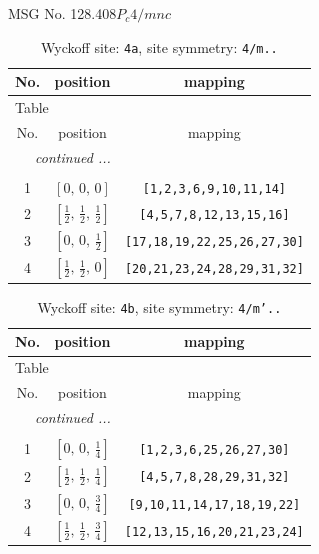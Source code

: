 \documentclass[fleqn,8pt]{jsarticle}
\begin{document}
\setcounter{MaxMatrixCols}{32}

\renewcommand{\tablename}{Table~}
\renewcommand{\figurename}{Figure~}
\begin{center}
\LARGE
MSG No. 128.408\quad$P_{c}4/mnc$
\end{center}
\renewcommand{\arraystretch}{1.2}
\begin{longtable}{ccc}
\caption{Wyckoff site: {\tt 4a}, site symmetry: {\tt 4/m..}}
 \\
 \hline \hline
No. & position & mapping \\ \hline \endfirsthead

\multicolumn{2}{l}{\tablename\ \thetable{}} \\
 \hline \hline
No. & position & mapping \\ \hline \endhead

 \hline \hline
\multicolumn{2}{r}{\footnotesize\it continued ...} \\ \endfoot

 \hline \hline
\multicolumn{2}{r}{} \\ \endlastfoot

1 & $\left[ 0,\, 0,\, 0 \right]$ & {\tt [1,2,3,6,9,10,11,14]} \\ \hline
2 & $\left[ \frac{1}{2},\, \frac{1}{2},\, \frac{1}{2} \right]$ & {\tt [4,5,7,8,12,13,15,16]} \\ \hline
3 & $\left[ 0,\, 0,\, \frac{1}{2} \right]$ & {\tt [17,18,19,22,25,26,27,30]} \\ \hline
4 & $\left[ \frac{1}{2},\, \frac{1}{2},\, 0 \right]$ & {\tt [20,21,23,24,28,29,31,32]} \\
\end{longtable}
\renewcommand{\arraystretch}{1.2}
\begin{longtable}{ccc}
\caption{Wyckoff site: {\tt 4b}, site symmetry: {\tt 4/m'..}}
 \\
 \hline \hline
No. & position & mapping \\ \hline \endfirsthead

\multicolumn{2}{l}{\tablename\ \thetable{}} \\
 \hline \hline
No. & position & mapping \\ \hline \endhead

 \hline \hline
\multicolumn{2}{r}{\footnotesize\it continued ...} \\ \endfoot

 \hline \hline
\multicolumn{2}{r}{} \\ \endlastfoot

1 & $\left[ 0,\, 0,\, \frac{1}{4} \right]$ & {\tt [1,2,3,6,25,26,27,30]} \\ \hline
2 & $\left[ \frac{1}{2},\, \frac{1}{2},\, \frac{1}{4} \right]$ & {\tt [4,5,7,8,28,29,31,32]} \\ \hline
3 & $\left[ 0,\, 0,\, \frac{3}{4} \right]$ & {\tt [9,10,11,14,17,18,19,22]} \\ \hline
4 & $\left[ \frac{1}{2},\, \frac{1}{2},\, \frac{3}{4} \right]$ & {\tt [12,13,15,16,20,21,23,24]} \\
\end{longtable}
\end{document}
